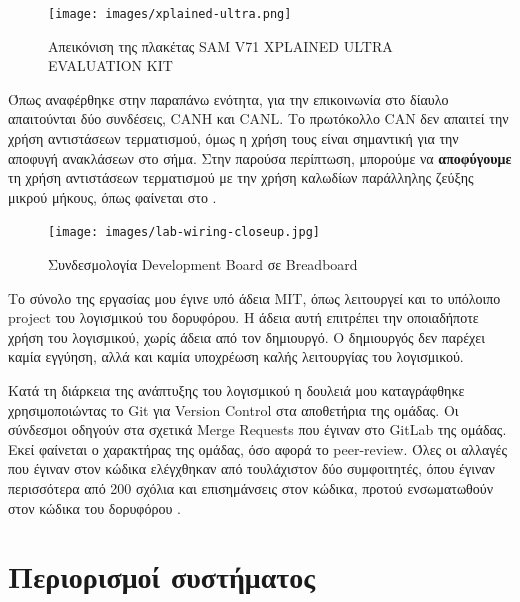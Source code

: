 \documentclass[a4paper,nobib,justified]{tufte-book}
\begin{document}
\begin{figure}
	\centering
	\texttt{[image: images/xplained-ultra.png]}
	\label{fig:xplained-ultra}
	\caption[Απεικόνιση της πλακέτας SAM V71 XPLAINED ULTRA EVALUATION KIT]{Απεικόνιση της πλακέτας SAM V71 XPLAINED ULTRA EVALUATION KIT}
\end{figure}

Όπως αναφέρθηκε στην παραπάνω ενότητα, για την επικοινωνία στο δίαυλο απαιτούνται δύο συνδέσεις, CANH και CANL. Το πρωτόκολλο CAN δεν απαιτεί την χρήση αντιστάσεων τερματισμού, όμως η χρήση τους είναι σημαντική για την αποφυγή ανακλάσεων στο σήμα. Στην παρούσα περίπτωση, μπορούμε να \textbf{αποφύγουμε} τη χρήση αντιστάσεων τερματισμού με την χρήση καλωδίων παράλληλης ζεύξης μικρού μήκους, όπως φαίνεται στο .

\begin{figure}
	\texttt{[image: images/lab-wiring-closeup.jpg]}
	\label{fig:lab-wiring-closeup}
	\caption[Συνδεσμολογία Development Board σε Breadboard]{Συνδεσμολογία Development Board σε Breadboard}
\end{figure}

Το σύνολο της εργασίας μου έγινε υπό άδεια MIT,  όπως λειτουργεί και το υπόλοιπο project του λογισμικού του δορυφόρου. Η άδεια αυτή επιτρέπει την οποιαδήποτε χρήση του λογισμικού, χωρίς άδεια από τον δημιουργό. Ο δημιουργός δεν παρέχει καμία εγγύηση, αλλά και καμία υποχρέωση καλής λειτουργίας του λογισμικού. 

Κατά τη διάρκεια της ανάπτυξης του λογισμικού η δουλειά μου καταγράφθηκε χρησιμοποιώντας το Git για Version Control στα αποθετήρια της ομάδας. Οι σύνδεσμοι οδηγούν στα σχετικά Merge Requests που έγιναν στο GitLab της ομάδας. Εκεί φαίνεται ο χαρακτήρας της ομάδας, όσο αφορά το peer-review. Όλες οι αλλαγές που έγιναν στον κώδικα ελέγχθηκαν από τουλάχιστον δύο συμφοιτητές, όπου έγιναν περισσότερα από 200 σχόλια και επισημάνσεις στον κώδικα, προτού ενσωματωθούν στον κώδικα του δορυφόρου . 

\clearpage
\section{Περιορισμοί συστήματος}
\end{document}

